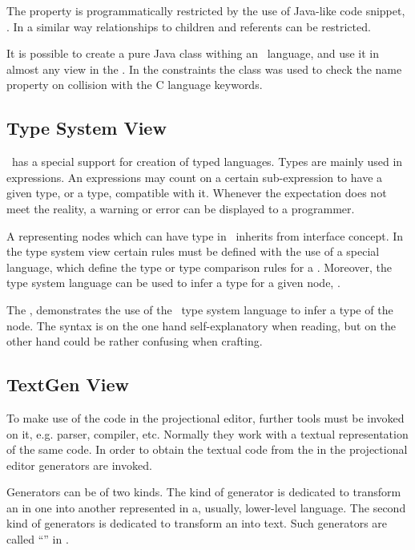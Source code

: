 The  property is programmatically restricted by the use of Java-like code snippet, . In a similar way
relationships to children and referents can be restricted.

It is possible to create a pure Java class withing an \jbmps\ language, and use it in almost any  view in the \jbmps. 
In the   constraints the  class was used to check the
name property on collision with the C language keywords.

\subsection{Type System View}
\jbmps\ has a special support for creation of typed languages. Types are mainly used in expressions. An expressions may count on 
a certain sub-expression to have a given type, or a type, compatible with it. Whenever the expectation does not meet the reality,
a warning or error can be displayed to a programmer. 


A  representing nodes which can have type in \mbdr\ inherits from  interface concept. In the type system view
certain rules must be defined with the use of a special language, which define the type or type comparison rules for a .
Moreover, the type system language can be used to infer a type for a given node, .

The , demonstrates the use of the \jbmps\ type system language to infer a type of the  
node. The syntax is on the one hand self-explanatory when reading, but on the other hand could be rather confusing when crafting.

\subsection{TextGen View}

To make use of the code in the projectional editor, further tools must be invoked on it, e.g. parser, compiler, etc.
Normally they work with a textual representation of the same code. In order to obtain the textual code from the  in the projectional
editor generators are invoked. 

Generators can be of two kinds. The kind of generator is dedicated to transform an  in one  into
another  represented in a, usually, lower-level language. The second kind of generators is dedicated to transform an  into text.
Such generators are called ``'' in \jbmps.

